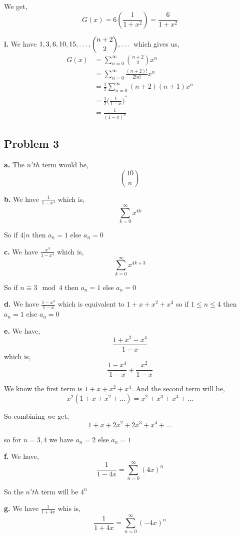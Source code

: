 \documentclass[a4paper]{report}
\begin{document}
We get, 
$$ G(x) = 6(\frac{1}{1 + x^2}) = \frac{6}{1 + x^2}$$



\textbf{l.}  We have $\displaystyle \displaystyle 1,3,6,10,15,\dots,\binom{n+2}{2},\dots$ which gives us,  
\begin{align*}
    G(x) &= \sum_{n=0}^{\infty} {n + 2\choose 2} x^{n} \\
         &= \sum_{n=0}^{\infty} \frac{(n + 2)!}{2! n!} x^{n}\\
         &=\frac{1}{2} \sum_{n=0}^{\infty} (n + 2)(n + 1) x^{n}\\
         &= \frac{1}{2} \bigg(\frac{1}{1-x^{}} \bigg)^{''}\\
         &= \frac{1}{(1-x)^{3}}
\end{align*}
\subsection*{Problem 3}
\textbf{a.} The $n'th$ term would be, 
$$ 10 \choose n $$ 


\textbf{b.}  We have $\frac{1}{1- x^{4}}$ which is, 
$$ \sum_{k=0}^{\infty} x^{4k}$$

So if $4 | n$ then  $a_n = 1$ else  $a_n = 0$

\textbf{c. } We have $\frac{x^{3}}{1 - x^{4}}$ which is, 
$$ \sum_{k=0}^{\infty} x^{4k + 3} $$ 

So if $n \equiv 3 \mod 4$ then  $a_n = 1$ else  $a_n = 0$ 

\textbf{d.}  We have $\frac{1 - x^{4}}{1 - x}$ which is equivalent to $1 + x + x^2 + x^{3}$ so if $1 \le n \le 4$ then $a_n = 1$ else $a_n = 0$

\textbf{e. }  We have, 
$$ \frac{1 + x^2 - x^{4}}{1 - x} $$  which is, 
$$ \frac{1 - x^{4}}{1 - x} + \frac{x^2}{1 - x} $$ 

We know the first term is $1 + x + x^2 + x^{4}$. And the second term will be, 
$$ x^2 (1 + x + x^2 + \dots) = x^2 + x^{3} + x^{4} + \dots $$ 

So combining we get, 
$$ 1 + x + 2x^2 + 2x^{3} + x^{4} + \dots $$ 

so for $n = 3,4$ we have $a_n = 2$ else $a_n = 1$

\textbf{f.} We have, 
$$ \frac{1}{1 - 4x} = \sum_{n=0}^{\infty} (4x)^{n} $$ 

So the $n'th$ term will be $4^{n}$

\textbf{g.}  We have $\frac{1}{1 + 4x}$ 
whis is, 
$$ \frac{1}{1+ 4x} = \sum_{n=0}^{\infty} (-4x)^{n} $$ 
\end{document}

